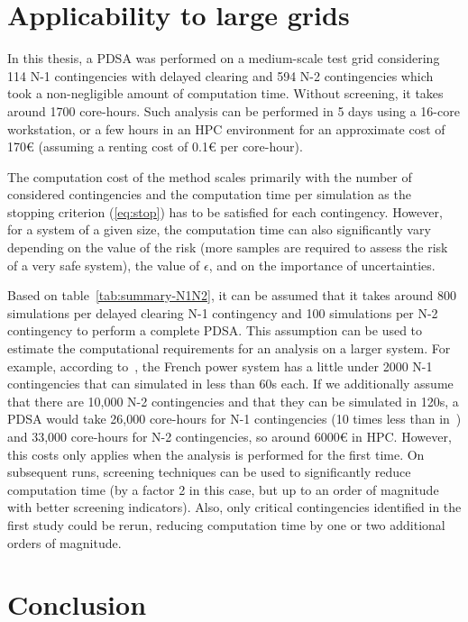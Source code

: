 \section{Applicability to large grids}
\label{sec:PDSA_scalability}


In this thesis, a PDSA was performed on a medium-scale test grid considering 114 N-1 contingencies with delayed clearing and 594 N-2 contingencies which took a non-negligible amount of computation time. Without screening, it takes around 1700 core-hours. Such analysis can be performed in 5 days using a 16-core workstation, or a few hours in an HPC environment for an approximate cost of 170€ (assuming a renting cost of 0.1€ per core-hour).

The computation cost of the method scales primarily with the number of considered contingencies and the computation time per simulation as the stopping criterion (\ref{eq:stop}) has to be satisfied for each contingency. However, for a system of a given size, the computation time can also significantly vary depending on the value of the risk (more samples are required to assess the risk of a very safe system), the value of \(\epsilon\), and on the importance of uncertainties.

Based on table~\ref{tab:summary-N1N2}, it can be assumed that it takes around 800 simulations per delayed clearing N-1 contingency and 100 simulations per N-2 contingency to perform a complete PDSA. This assumption can be used to estimate the computational requirements for an analysis on a larger system. For example, according to~\cite{EurostagHPC}, the French power system has a little under 2000 N-1 contingencies that can simulated in less than 60s each. If we additionally assume that there are 10,000 N-2 contingencies and that they can be simulated in 120s, a PDSA would take 26,000 core-hours for N-1 contingencies (10 times less than in~\cite{EurostagHPC}) and 33,000 core-hours for N-2 contingencies, so around 6000€ in HPC. However, this costs only applies when the analysis is performed for the first time. On subsequent runs, screening techniques can be used to significantly reduce computation time (by a factor 2 in this case, but up to an order of magnitude with better screening indicators). Also, only critical contingencies identified in the first study could be rerun, reducing computation time by one or two additional orders of magnitude.

\section{Conclusion}
\label{sec:PDSA_conclusion}

